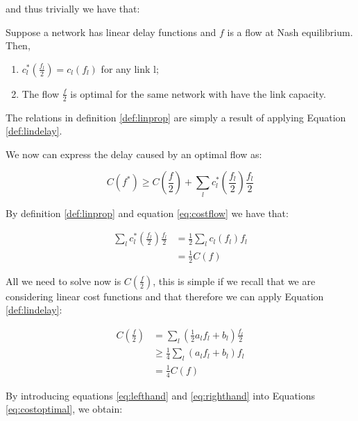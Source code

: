 and thus trivially we have that:

\begin{definition}
 Suppose a network has linear delay functions and $f$ is a flow at Nash equilibrium. Then,

\begin{enumerate}
 \item $c_{l}^{*}\left(\frac{f_{l}}{2}\right) = c_{l}(f_{l})$ for any link l;
 \item The flow $\frac{f}{2}$ is optimal for the same network with have the link capacity.
\end{enumerate}
\label{def:linprop}
\end{definition}

The relations in definition \ref{def:linprop} are simply a result of applying Equation \ref{def:lindelay}. 

We now can express the delay caused by an optimal flow as:

\begin{equation}
 C(f^{*}) \geq C\left(\frac{f}{2}\right) + \displaystyle\sum\limits_{l} c_{l}^{*}\left(\frac{f_{l}}{2}\right)\frac{f_{l}}{2}
  \label{eq:costoptimal}
\end{equation}

By definition \ref{def:linprop} and equation \ref{eq:costflow} we have that:

\begin{align}
  \displaystyle\sum\limits_{l} c_{l}^{*}\left(\frac{f_{l}}{2}\right)\frac{f_{l}}{2} &= \frac{1}{2} \displaystyle\sum\limits_{l} c_{l}\left(f_{l}\right)f_{l} \\
  &= \frac{1}{2}C(f)
  \label{eq:righthand}
\end{align}

All we need to solve now is $C\left(\frac{f}{2}\right)$, this is simple if we recall that we are considering linear cost functions and that therefore we can apply Equation \ref{def:lindelay}:

\begin{align}
 C(\frac{f}{2}) &= \displaystyle\sum\limits_{l} \left(\frac{1}{2}a_{l}f_{l} + b_{l}\right)\frac{f_{l}}{2} \\
& \geq \frac{1}{4}\displaystyle\sum\limits_{l} \left(a_{l}f_{l} + b_{l}\right)f_{l}\\
& = \frac{1}{4} C(f)
\label{eq:lefthand}
\end{align}

By introducing equations \ref{eq:lefthand} and \ref{eq:righthand} into Equations \ref{eq:costoptimal}, we obtain:

